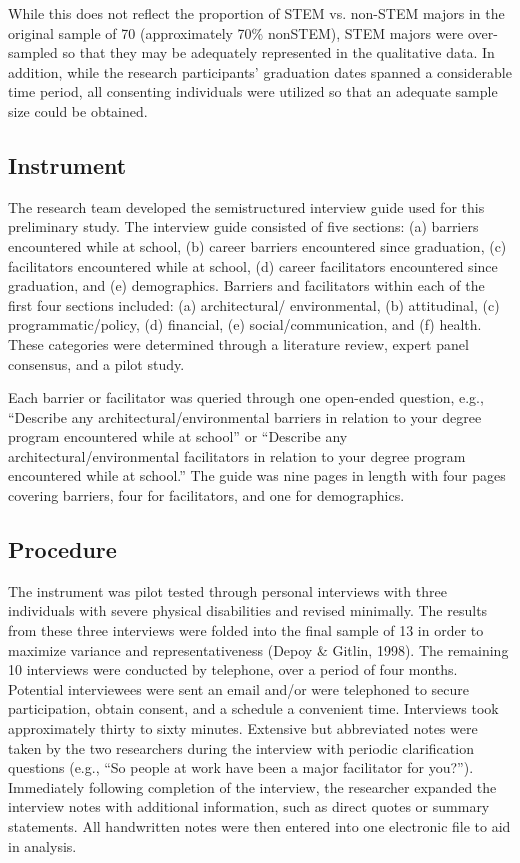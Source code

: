 \documentclass[11.5pt]{sig-alternate} %
\begin{document}
\begin{large}
While this does not reflect the proportion of STEM vs. non-STEM majors in the original sample of 70 (approximately 70\% nonSTEM), STEM majors were over-sampled so that they may be adequately represented in the qualitative data. In addition, while the research participants' graduation dates spanned a considerable time period, all consenting individuals were utilized so that an adequate sample size could be obtained. 

\subsection*{Instrument}
The research team developed the semistructured interview guide used for this preliminary study. The interview guide consisted of five sections: (a) barriers encountered while at school, (b) career barriers encountered since graduation, (c) facilitators encountered while at school, (d) career facilitators encountered since graduation, and (e) demographics. Barriers and facilitators within each of the first four sections included: (a) architectural/ environmental, (b) attitudinal, (c) programmatic/policy, (d) financial, (e) social/communication, and (f) health. These categories were determined through a literature review, expert panel consensus, and a pilot study. 

Each barrier or facilitator was queried through one open-ended question, e.g., “Describe any architectural/environmental barriers in relation to your degree program encountered while at school” or “Describe any architectural/environ\-mental facilitators in relation to your degree program encountered while at school.” The guide was nine pages in length with four pages covering barriers, four for facilitators, and one for demographics.

\subsection*{Procedure}
The instrument was pilot tested through personal interviews with three individuals with severe physical disabilities and revised minimally. The results from these three interviews were folded into the final sample of 13 in order to maximize variance and representativeness (Depoy & Gitlin, 1998). The remaining 10 interviews were conducted by telephone, over a period of four months. Potential interviewees were sent an email and/or were telephoned to secure participation, obtain consent, and a schedule a convenient time. Interviews took approximately thirty to sixty minutes. Extensive but abbreviated notes were taken by the two researchers during the interview with periodic clarification questions (e.g., “So people at work have been a major facilitator for you?”). Immediately following completion of the interview, the researcher expanded the interview notes with additional information, such as direct quotes or summary statements. All handwritten notes were then entered into one electronic file to aid in analysis.



\end{large}
\end{document}
